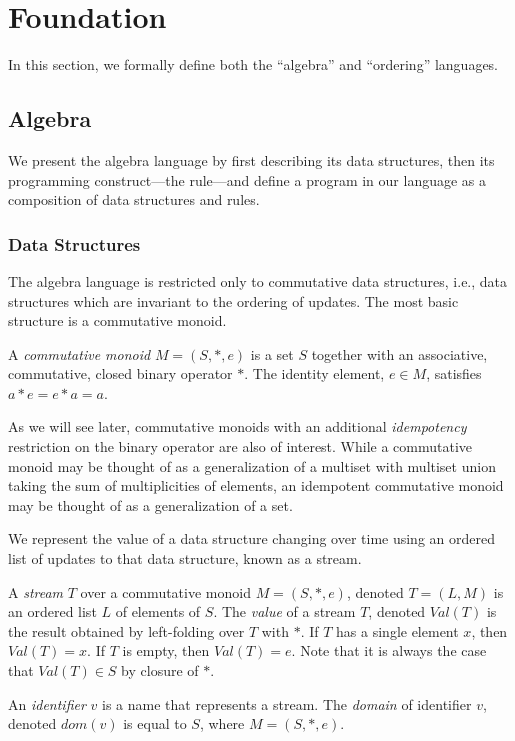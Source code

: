 \section{Foundation}
\label{sec:foundation}

In this section, we formally define both the ``algebra'' and ``ordering'' languages.

\subsection{Algebra}

We present the algebra language by first describing its data structures, then its programming construct---the rule---and define a program in our language as a composition of data structures and rules.

\subsubsection{Data Structures}

The algebra language is restricted only to commutative data structures, i.e., data structures which are invariant to the ordering of updates.  The most basic structure is a commutative monoid.

A {\em commutative monoid} $M = (S, *, e)$ is a set $S$ together with an associative, commutative, closed binary operator $*$.  The identity element, $e \in M$, satisfies $a*e = e*a = a$.

As we will see later, commutative monoids with an additional {\em idempotency} restriction on the binary operator are also of interest.  While a commutative monoid may be thought of as a generalization of a multiset with multiset union taking the sum of multiplicities of elements, an idempotent commutative monoid may be thought of as a generalization of a set.

We represent the value of a data structure changing over time using an ordered list of updates to that data structure, known as a stream.

A {\em stream} $T$ over a commutative monoid $M = (S, *, e)$, denoted $T = (L, M)$ is an ordered list $L$ of elements of $S$.  The {\em value} of a stream $T$, denoted $Val(T)$ is the result obtained by left-folding over $T$ with $*$.  If $T$ has a single element $x$, then $Val(T)=x$.  If $T$ is empty, then $Val(T)=e$.  Note that it is always the case that $Val(T) \in S$ by closure of $*$.

An {\em identifier} $v$ is a name that represents a stream.  The {\em domain} of identifier $v$, denoted $dom(v)$ is equal to $S$, where $M = (S, *, e)$.

